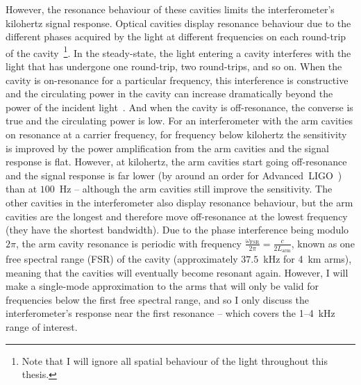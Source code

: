 However, the resonance behaviour of these cavities limits the interferometer's kilohertz signal response. Optical cavities display resonance behaviour due to the different phases acquired by the light at different frequencies on each round-trip of the cavity~\footnote{Note that I will ignore all spatial behaviour of the light throughout this thesis.}. In the steady-state, the light entering a cavity interferes with the light that has undergone one round-trip, two round-trips, and so on. When the cavity is on-resonance for a particular frequency, this interference is constructive and the circulating power in the cavity can increase dramatically beyond the power of the incident light~\cite{}. And when the cavity is off-resonance, the converse is true and the circulating power is low. 
For an interferometer with the arm cavities on resonance at a carrier frequency, for frequency below kilohertz the sensitivity is improved by the power amplification from the arm cavities and the signal response is flat. However, at kilohertz, the arm cavities start going off-resonance and the signal response is far lower (by around an order for Advanced~LIGO~\cite{}) than at $100$~Hz -- although the arm cavities still improve the sensitivity. The other cavities in the interferometer also display resonance behaviour, but the arm cavities are the longest and therefore move off-resonance at the lowest frequency (they have the shortest bandwidth).
Due to the phase interference being modulo $2\pi$, the arm cavity resonance is periodic with frequency $\frac{\omega_\text{FSR}}{2\pi}=\frac{c}{2L_\text{arm}}$, known as one free spectral range (FSR) of the cavity (approximately $37.5$~kHz for 4~km arms), meaning that the cavities will eventually become resonant again. However, I will make a single-mode approximation to the arms that will only be valid for frequencies below the first free spectral range, and so I only discuss the interferometer's response near the first resonance -- which covers the 1--4~kHz range of interest.

